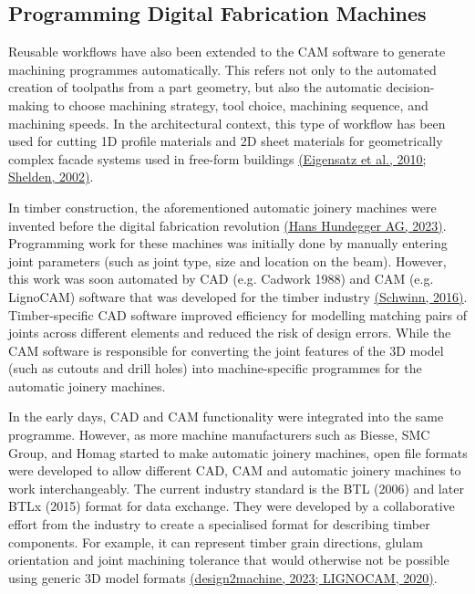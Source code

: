 \documentclass[11pt]{book}
\begin{document}
\subsection{Programming Digital Fabrication Machines}

Reusable workflows have also been extended to the CAM software to generate machining programmes automatically. This refers not only to the automated creation of toolpaths from a part geometry, but also the automatic decision-making to choose machining strategy, tool choice, machining sequence, and machining speeds. In the architectural context, this type of workflow has been used for cutting 1D profile materials and 2D sheet materials for geometrically complex facade systems used in free-form buildings \href{https://www.zotero.org/google-docs/?1ZGSxs}{(Eigensatz et al., 2010; Shelden, 2002)}.

In timber construction, the aforementioned automatic joinery machines were invented before the digital fabrication revolution \href{https://www.zotero.org/google-docs/?BhPxsy}{(Hans Hundegger AG, 2023)}. Programming work for these machines was initially done by manually entering joint parameters (such as joint type, size and location on the beam). However, this work was soon automated by CAD (e.g. Cadwork 1988) and CAM (e.g. LignoCAM) software that was developed for the timber industry \href{https://www.zotero.org/google-docs/?wIJjiT}{(Schwinn, 2016)}. Timber-specific CAD software improved efficiency for modelling matching pairs of joints across different elements and reduced the risk of design errors. While the CAM software is responsible for converting the joint features of the 3D model (such as cutouts and drill holes) into machine-specific programmes for the automatic joinery machines.

In the early days, CAD and CAM functionality were integrated into the same programme. However, as more machine manufacturers such as Biesse, SMC Group, and Homag started to make automatic joinery machines, open file formats\textbf{ }were developed to allow different CAD, CAM and automatic joinery machines to work interchangeably. The current industry standard is the BTL (2006) and later BTLx (2015) format for data exchange. They were developed by a collaborative effort from the industry to create a specialised format for describing timber components. For example, it can represent timber grain directions, glulam orientation and joint machining tolerance that would otherwise not be possible using generic 3D model formats \href{https://www.zotero.org/google-docs/?EuPkAC}{(}\href{https://www.zotero.org/google-docs/?EuPkAC}{design2machine}\href{https://www.zotero.org/google-docs/?EuPkAC}{, 2023; LIGNOCAM, 2020)}. 
\end{document}
